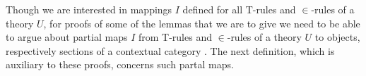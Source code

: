 Though we are interested in mappings $I$ defined for all T-rules and $\in$-rules of a theory $U$, for  proofs of some of the lemmas that we are to give 
we need to be able to argue about partial maps $I$ from T-rules and $\in$-rules of a theory $U$ to objects, respectively sections of a contextual category \catc.
The next definition, which is auxiliary to these proofs, concerns such partal maps.
\newcommand{\sjrule}   {\gatdisplayrule{Q}         {\ofT{s_j}{\Omega_j[s_1|y_1,...s_{j-1}|y_{j-1}]}}}
\newcommand{\omegarule}[1][]{\gatdisplayrule[#1]{\yOmega{m}}{\isT{\Omega}}}
\newcommand{\srule}    {\gatdisplayrule{\yOmega{m}}{\ofT{s}{\Omega}}}
\newcommand{\omegarulesubstituted}[1][]{\gatdisplayrule[#1]{Q}{\isT{\Omega[s_1|y_1...s_m|y_m]}} }
\newcommand{\srulesubstituted}[1][]{\gatdisplayrule[#1]{Q}{\ofT{s[s_1|y_1...s_m|y_m]}{\Omega[s_1|y_1...s_m|y_m]}} }


